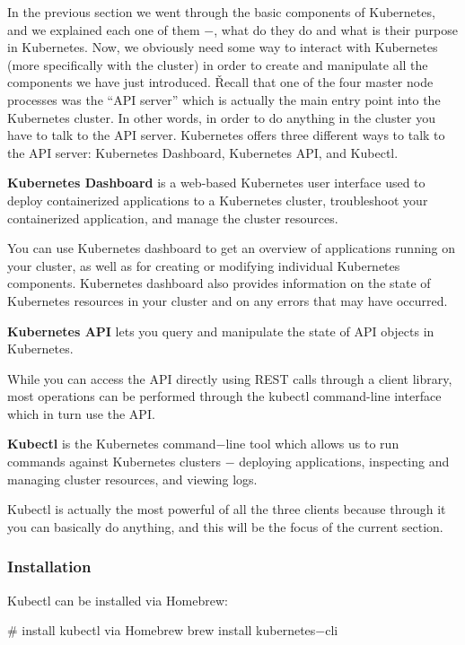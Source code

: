 In the previous section we went through the basic components of Kubernetes, and we explained each one of them $-$,
what do they do and what is their purpose in Kubernetes. Now, we obviously need some way to interact with Kubernetes
(more specifically with the cluster) in order to create and manipulate all the components we have just introduced. \v

Recall that one of the four master node processes was the ``API server'' which is actually the main entry point into
the Kubernetes cluster. In other words, in order to do anything in the cluster you have to talk to the API server.
Kubernetes offers three different ways to talk to the API server: Kubernetes Dashboard, Kubernetes API, and Kubectl.

\textbf{Kubernetes Dashboard} is a web-based Kubernetes user interface used to deploy containerized applications to a
Kubernetes cluster, troubleshoot your containerized application, and manage the cluster resources.
\ed

You can use Kubernetes dashboard to get an overview of applications running on your cluster, as well as for creating
or modifying individual Kubernetes components. Kubernetes dashboard also provides information on the state of
Kubernetes resources in your cluster and on any errors that may have occurred.

\textbf{Kubernetes API} lets you query and manipulate the state of API objects in Kubernetes.
\ed

While you can access the API directly using REST calls through a client library, most operations can be performed
through the kubectl command-line interface which in turn use the API.

\bd[Kubectl]
\textbf{Kubectl} is the Kubernetes command$-$line tool which allows us to run commands against Kubernetes clusters $-$
deploying applications, inspecting and managing cluster resources, and viewing logs.
\ed

Kubectl is actually the most powerful of all the three clients because through it you can basically do anything, and
this will be the focus of the current section.

\subsubsection{Installation}

Kubectl can be installed via Homebrew:

\begin{bash}
# install kubectl via Homebrew
brew install kubernetes$-$cli
\end{bash}

